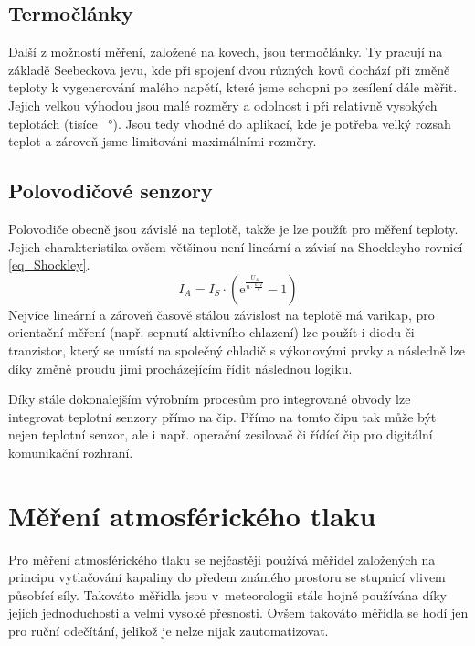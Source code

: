 \subsection{Termočlánky}

Další z možností měření, založené na kovech, jsou termočlánky. Ty pracují na základě Seebeckova jevu, kde při spojení dvou různých kovů dochází při změně teploty k vygenerování malého napětí, které jsme schopni po zesílení dále měřit. Jejich velkou výhodou jsou malé rozměry a odolnost i při relativně vysokých teplotách (tisíce \SI{}{\degree}). Jsou tedy vhodné do aplikací, kde je potřeba velký rozsah teplot a zároveň jsme limitováni maximálními rozměry.

\subsection{Polovodičové senzory}

Polovodiče obecně jsou závislé na teplotě, takže je lze použít pro měření teploty. Jejich charakteristika ovšem většinou není lineární a závisí na Shockleyho rovnicí \eqref{eq_Shockley}.
\begin{equation}
    I_A =I_S \cdot (\mathrm{e} ^{\frac{U_A}{n \cdot \frac{k \cdot T}{q}}} - 1)
    \label{eq_Shockley}
\end{equation}
Nejvíce lineární a zároveň časově stálou závislost na teplotě má varikap, pro orientační měření (např. sepnutí aktivního chlazení) lze použít i diodu či tranzistor, který se umístí na společný chladič s výkonovými prvky a následně lze díky změně proudu jimi procházejícím řídit následnou logiku.

Díky stále dokonalejším výrobním procesům pro integrované obvody lze integrovat teplotní senzory přímo na čip. Přímo na tomto čipu tak může být nejen teplotní senzor, ale i např. operační zesilovač či řídící čip pro digitální komunikační rozhraní.

\section{Měření atmosférického tlaku}

Pro měření atmosférického tlaku se nejčastěji používá měřidel založených na principu vytlačování kapaliny do předem známého prostoru se stupnicí vlivem působící síly. Takováto měřidla jsou v~meteorologii stále hojně používána díky jejich jednoduchosti a velmi vysoké přesnosti. Ovšem takováto měřidla se hodí jen pro ruční odečítání, jelikož je nelze nijak zautomatizovat.

